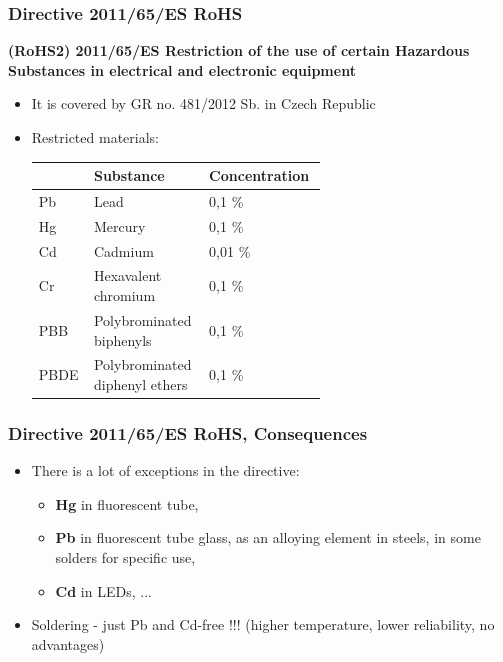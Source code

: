 \documentclass{beamer}
\begin{document}
	\begin{frame}
    \frametitle{Directive 2011/65/ES RoHS}
		\small
		\textbf{(\textbf{RoHS2}) 2011/65/ES Restriction of the use of certain Hazardous Substances in electrical and electronic equipment}
			
			\begin{itemize}
				\item It is covered by GR no. 481/2012 Sb. in Czech Republic
				\item Restricted materials:
				\begin{center}
				\begin{tabular}{|m{0.1\linewidth} |m{0.25\linewidth} |m{0.25\linewidth} |}
				\hline
				& Substance & Concentration\\
				\hline
				Pb & Lead & 0,1 \%\\
				Hg & Mercury & 0,1 \%\\
				Cd & Cadmium & 0,01 \%\\
				Cr & Hexavalent chromium & 0,1 \%\\
				PBB & Polybrominated biphenyls & 0,1 \%\\
				PBDE & Polybrominated diphenyl ethers & 0,1 \%\\
				\hline
				\end{tabular}
			\end{center}
			\end{itemize}
	\end{frame}
	\begin{frame}
    \frametitle{Directive 2011/65/ES RoHS, Consequences}
			\begin{itemize}
				\item There is a lot of exceptions in the directive:
				
				\begin{itemize}
					\item \textbf{Hg} in fluorescent tube,
					\item \textbf{Pb} in fluorescent tube glass, as an alloying element  in steels, in some solders for specific use,
					\item \textbf{Cd} in LEDs, ...
				\end{itemize}
				\item Soldering - just Pb and Cd-free !!! (higher temperature, lower reliability, no advantages)
			\end{itemize}
	\end{frame}
\end{document}
